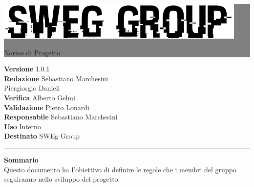 \documentclass[12pt,a4paper,titlepage]{article}
\newcommand{\HRule}[1]{\hfill \rule{0.2\linewidth}{#1}} %
\begin{document}
	
	\thispagestyle{empty} %
	
	
	\colorbox{grey}{
		\parbox[t]{1.0\linewidth}{
			\centering \fontsize{50pt}{80pt}\selectfont %
			\vspace*{0.7cm} %
			
			\raggedleft
			\includegraphics[width=0.7\linewidth]{../LogoSWEgGroupSFONDOVUOTO.png}
			
			\hfill Norme di Progetto \\
			
			\vspace*{0.7cm} %
		}
	}
	
	
	\vfill %
	
	
	{\centering \large 
		\hfill \textbf{Versione} 1.0.1 \\
		\hfill \textbf{Redazione} Sebastiano Marchesini \\
		\hfill Piergiorgio Danieli \\
		\hfill \textbf{Verifica} Alberto Gelmi \\
		\hfill \textbf{Validazione} Pietro Lonardi \\
		\hfill \textbf{Responsabile} Sebastiano Marchesini \\
		\hfill \textbf{Uso} Interno \\
		\hfill \textbf{Destinato} SWEg Group \\ 
		
		\HRule{1pt}
		
		\textbf{Sommario} \\
		Questo documento ha l'obiettivo di definire le regole che i membri del gruppo seguiranno nello sviluppo del progetto.
		
	} %
	
\end{document}
